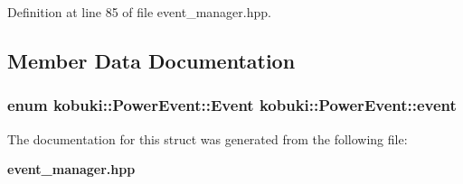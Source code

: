 \-Definition at line 85 of file event\-\_\-manager.\-hpp.



\subsection{\-Member \-Data \-Documentation}
\subsubsection[{event}]{\setlength{\rightskip}{0pt plus 5cm}enum {\bf kobuki\-::\-Power\-Event\-::\-Event}  {\bf kobuki\-::\-Power\-Event\-::event}}\label{structkobuki_1_1PowerEvent_a69cd47f8f7316e75a4c55dfea2e34d29}


\-The documentation for this struct was generated from the following file\-:\begin{DoxyCompactItemize}
\item 
{\bf event\-\_\-manager.\-hpp}\end{DoxyCompactItemize}
